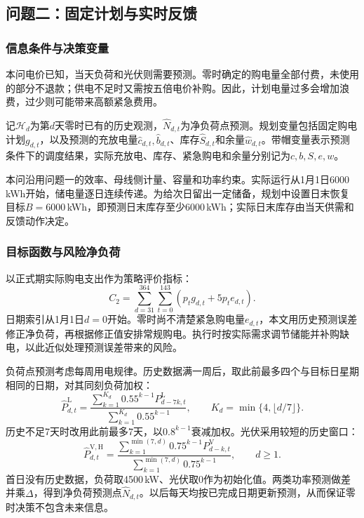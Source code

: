 \subsection{问题二：固定计划与实时反馈}\label{sec:q2}
\subsubsection{信息条件与决策变量}
本问电价已知，当天负荷和光伏则需要预测。零时确定的购电量全部付费，未使用的部分不退款；供电不足时又需按五倍电价补购。因此，计划电量过多会增加浪费，过少则可能带来高额紧急费用。

记$\mathcal H_d$为第$d$天零时已有的历史观测，$\widehat N_{d,t}$为净负荷点预测。规划变量包括固定购电计划$g_{d,t}$，以及预测的充放电量$\widehat c_{d,t},\widehat b_{d,t}$、库存$\widehat S_{d,t}$和余量$\widehat w_{d,t}$。带帽变量表示预测条件下的调度结果，实际充放电、库存、紧急购电和余量分别记为$c,b,S,e,w$。

本问沿用问题一的效率、母线侧计量、容量和功率约束。实际运行从1月1日6000\,kWh开始，储电量逐日连续传递。为给次日留出一定储备，规划中设置日末恢复目标$B=6000$\,kWh，即预测日末库存至少6000\,kWh；实际日末库存由当天供需和反馈动作决定。

\subsubsection{目标函数与风险净负荷}
以正式期实际购电支出作为策略评价指标：
\begin{equation}
 C_2=\sum_{d=31}^{364}\sum_{t=0}^{143}
       \left(p_tg_{d,t}+5p_te_{d,t}\right).\label{eq:q2-bill}
\end{equation}
日期索引从1月1日$d=0$开始。零时尚不清楚紧急购电量$e_{d,t}$，本文用历史预测误差修正净负荷，再根据修正值安排常规购电。执行时按实际需求调节储能并补购缺电，以此近似处理预测误差带来的风险。

负荷点预测考虑每周用电规律。历史数据满一周后，取此前最多四个与目标日星期相同的日期，对其同刻负荷加权：
\begin{equation}
 \widehat P^{\mathrm L}_{d,t}=
 \frac{\sum_{k=1}^{K_d}0.55^{k-1}P^{\mathrm L}_{d-7k,t}}
      {\sum_{k=1}^{K_d}0.55^{k-1}},\qquad
 K_d=\min\{4,\lfloor d/7\rfloor\}.\label{eq:load-history}
\end{equation}
历史不足7天时改用此前最多7天，以$0.8^{k-1}$衰减加权。光伏采用较短的历史窗口：
\begin{equation}
 \widehat P^{\mathrm{V,H}}_{d,t}=
 \frac{\sum_{k=1}^{\min(7,d)}0.75^{k-1}P^{\mathrm V}_{d-k,t}}
      {\sum_{k=1}^{\min(7,d)}0.75^{k-1}},\qquad d\ge1.
\end{equation}
首日没有历史数据，负荷取4500\,kW、光伏取0作为初始化值。两类功率预测做差并乘$\Delta$，得到净负荷预测点$\widehat N_{d,t}$。以后每天均按已完成日期更新预测，从而保证零时决策不包含未来信息。

